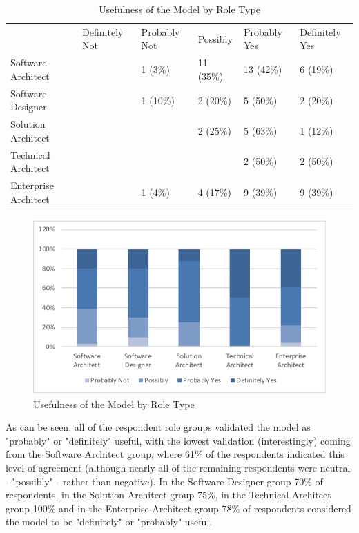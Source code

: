 \begin{table}
\caption{Usefulness of the Model by Role Type}
\label{table:usefulnessbyrole}
\footnotesize
\begin{tabular}{l p{1.5cm} p{1.5cm} p{1.5cm} p{1.5cm} p{1.5cm}}
 & Definitely Not & Probably Not & Possibly & Probably Yes & Definitely Yes \\
Software Architect	 &  &  1 (3\%)  & 11 (35\%) & 13 (42\%) & 6 (19\%) \\
Software Designer    &  &  1 (10\%) & 2 (20\%)  & 5 (50\%)	& 2 (20\%) \\
Solution Architect   &  &           & 2 (25\%)  & 5 (63\%)  & 1 (12\%) \\
Technical Architect	 &  &           &           & 2 (50\%)  & 2 (50\%) \\
Enterprise Architect &  & 1 (4\%)   & 4 (17\%)  & 9 (39\%)  & 9 (39\%) \\
\end{tabular}
\end{table}

\begin{figure}[h]
\centering
\includegraphics[width=12cm,trim={2 2 2 2},clip]{Figures/prioritisation-usefulness-by-role}
\caption{Usefulness of the Model by Role Type}
\label{figure:usefulnessbyrole}
\end{figure}

As can be seen, all of the respondent role groups validated the model as "probably" or "definitely" useful, with the lowest validation (interestingly) coming from the Software Architect group, where 61\% of the respondents indicated this level of agreement (although nearly all of the remaining respondents were neutral - "possibly" - rather than negative).  In the Software Designer group 70\% of respondents, in the Solution Architect group 75\%, in the Technical Architect group 100\% and in the Enterprise Architect group 78\% of respondents considered the model to be "definitely" or "probably" useful.

